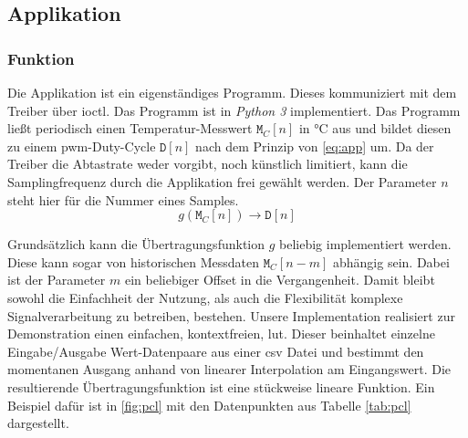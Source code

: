 \subsection{Applikation}

\subsubsection{Funktion}

Die Applikation ist ein eigenständiges Programm.
Dieses kommuniziert mit dem Treiber über \gls{ioctl}.
Das Programm ist in \textit{Python 3} implementiert.
Das Programm ließt periodisch einen Temperatur-Messwert $\texttt{M}_C[n]$ in \si{\celsius} aus und bildet diesen zu einem \gls{pwm}-Duty-Cycle $\texttt{D}[n]$ nach dem Prinzip von \autoref{eq:app} um.
Da der Treiber die Abtastrate weder vorgibt, noch künstlich limitiert, kann die Samplingfrequenz durch die Applikation frei gewählt werden. Der Parameter $n$ steht hier für die Nummer eines Samples.
\begin{equation}
    g \left( \texttt{M}_C \left[n\right] \right) \rightarrow \texttt{D}\left[n\right]
    \label{eq:app}
\end{equation}

Grundsätzlich kann die Übertragungsfunktion $g$ beliebig implementiert werden.
Diese kann sogar von historischen Messdaten $\texttt{M}_C[n-m]$ abhängig sein.
Dabei ist der Parameter $m$ ein beliebiger Offset in die Vergangenheit.
Damit bleibt sowohl die Einfachheit der Nutzung, als auch die Flexibilität komplexe Signalverarbeitung zu betreiben, bestehen.
Unsere Implementation realisiert zur Demonstration einen einfachen, kontextfreien, \gls{lut}.
Dieser beinhaltet einzelne Eingabe/Ausgabe Wert-Datenpaare aus einer \gls{csv} Datei und bestimmt den momentanen Ausgang anhand von linearer Interpolation am Eingangswert.
Die resultierende Übertragungsfunktion ist eine stückweise lineare Funktion.
Ein Beispiel dafür ist in \autoref{fig:pcl} mit den Datenpunkten aus Tabelle \ref{tab:pcl} dargestellt.

